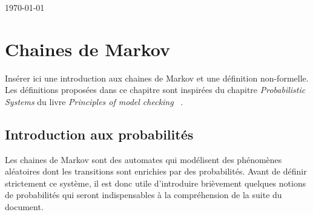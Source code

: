 \documentclass[12pt,a4paper]{report}
\theoremstyle{definition}
\theoremstyle{remark}
\begin{document}
\begin{titlepage}
	
	\vspace{7cm}
	{\large \today}\\[3cm] %
	
	
	
	
	\vfill %
	
\end{titlepage}

\newpage
\tableofcontents
\listoftheorems[ignoreall,show={definition,example}]
\newpage

\chapter{Chaines de Markov}

Insérer ici une introduction aux chaines de Markov et une définition non-formelle.\\

Les définitions proposées dans ce chapitre sont inspirées du chapitre \textit{Probabilistic Systems} du livre \textit{Principles of model checking} ~\cite{DBLP:books/daglib/0020348}.

\section{Introduction aux probabilités}
Les chaines de Markov sont des automates qui modélisent des phénomènes aléatoires dont les transitions sont enrichies par des probabilités. Avant de définir strictement ce système, il est donc utile d'introduire brièvement quelques notions de probabilités qui seront indispensables à la compréhension de la suite du document.
\end{document}
